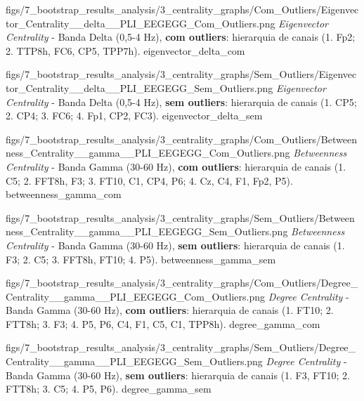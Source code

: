 \ultrawidefigure
  {figs/7_bootstrap_results_analysis/3_centrality_graphs/Com_Outliers/Eigenvector_Centrality__delta__PLI_EEGEGG_Com_Outliers.png}
  {\textit{Eigenvector Centrality} - Banda Delta (0{,}5-4 Hz), \textbf{com outliers}: hierarquia de canais (1. Fp2; 2. TTP8h, FC6, CP5, TPP7h).}
  {eigenvector_delta_com}

\ultrawidefigure
  {figs/7_bootstrap_results_analysis/3_centrality_graphs/Sem_Outliers/Eigenvector_Centrality__delta__PLI_EEGEGG_Sem_Outliers.png}
  {\textit{Eigenvector Centrality} - Banda Delta (0{,}5-4 Hz), \textbf{sem outliers}: hierarquia de canais (1. CP5; 2. CP4; 3. FC6; 4. Fp1, CP2, FC3).}
  {eigenvector_delta_sem}


\ultrawidefigure
  {figs/7_bootstrap_results_analysis/3_centrality_graphs/Com_Outliers/Betweenness_Centrality__gamma__PLI_EEGEGG_Com_Outliers.png}
  {\textit{Betweenness Centrality} - Banda Gamma (30-60 Hz), \textbf{com outliers}: hierarquia de canais (1. C5; 2. FFT8h, F3; 3. FT10, C1, CP4, P6; 4. Cz, C4, F1, Fp2, P5).}
  {betweenness_gamma_com}

\ultrawidefigure
  {figs/7_bootstrap_results_analysis/3_centrality_graphs/Sem_Outliers/Betweenness_Centrality__gamma__PLI_EEGEGG_Sem_Outliers.png}
  {\textit{Betweenness Centrality} - Banda Gamma (30-60 Hz), \textbf{sem outliers}: hierarquia de canais (1. F3; 2. C5; 3. FFT8h, FT10; 4. P5).}
  {betweenness_gamma_sem}


\ultrawidefigure
  {figs/7_bootstrap_results_analysis/3_centrality_graphs/Com_Outliers/Degree_Centrality__gamma__PLI_EEGEGG_Com_Outliers.png}
  {\textit{Degree Centrality} - Banda Gamma (30-60 Hz), \textbf{com outliers}: hierarquia de canais (1. FT10; 2. FTT8h; 3. F3; 4. P5, P6, C4, F1, C5, C1, TPP8h).}
  {degree_gamma_com}

\ultrawidefigure
  {figs/7_bootstrap_results_analysis/3_centrality_graphs/Sem_Outliers/Degree_Centrality__gamma__PLI_EEGEGG_Sem_Outliers.png}
  {\textit{Degree Centrality} - Banda Gamma (30-60 Hz), \textbf{sem outliers}: hierarquia de canais (1. F3, FT10; 2. FTT8h; 3. C5; 4. P5, P6).}
  {degree_gamma_sem}

